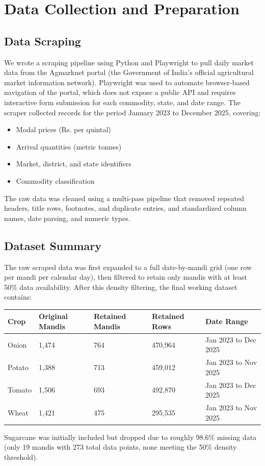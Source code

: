 \documentclass[12pt,a4paper]{article}
\begin{document}
\section{Data Collection and Preparation}
\subsection{Data Scraping}
We wrote a scraping pipeline using Python and Playwright to pull daily market data from the Agmarknet portal (the Government of India's official agricultural market information network). Playwright was used to automate browser-based navigation of the portal, which does not expose a public API and requires interactive form submission for each commodity, state, and date range. The scraper collected records for the period January 2023 to December 2025, covering:

\begin{itemize}
\item Modal prices (Rs. per quintal)
\item Arrival quantities (metric tonnes)
\item Market, district, and state identifiers
\item Commodity classification
\end{itemize}
The raw data was cleaned using a multi-pass pipeline that removed repeated headers, title rows, footnotes, and duplicate entries, and standardized column names, date parsing, and numeric types.

\subsection{Dataset Summary}
The raw scraped data was first expanded to a full date-by-mandi grid (one row per mandi per calendar day), then filtered to retain only mandis with at least 50\% data availability. After this density filtering, the final working dataset contains:

\begin{table}[H]
\centering
\begin{tabular}{lllll}
\toprule
\textbf{Crop} & \textbf{Original Mandis} & \textbf{Retained Mandis} & \textbf{Retained Rows} & \textbf{Date Range} \\
\midrule
Onion & 1,474 & 764 & 470,964 & Jan 2023 to Dec 2025 \\
Potato & 1,388 & 713 & 459,012 & Jan 2023 to Nov 2025 \\
Tomato & 1,506 & 693 & 492,870 & Jan 2023 to Dec 2025 \\
Wheat & 1,421 & 475 & 295,535 & Jan 2023 to Nov 2025 \\
\bottomrule
\end{tabular}
\end{table}
Sugarcane was initially included but dropped due to roughly 98.6\% missing data (only 19 mandis with 273 total data points, none meeting the 50\% density threshold).
\end{document}
